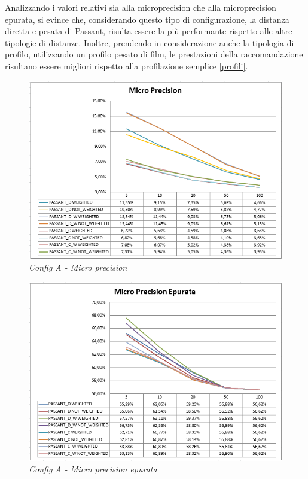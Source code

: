 Analizzando i valori relativi sia alla microprecision che alla microprecision epurata, si evince che, considerando questo tipo di configurazione, la distanza diretta e pesata di Passant, risulta essere la più performante rispetto alle altre tipologie di distanze. Inoltre, prendendo in considerazione anche la tipologia di profilo, utilizzando un profilo pesato di film, le prestazioni della raccomandazione risultano essere migliori rispetto alla profilazione semplice \ref{profili}.
\begin{figure}[H]
	\includegraphics[width=.9\textwidth]{./images/graphs/micro_prec_Own}
	\caption{\emph{Config A - Micro precision}}
\end{figure}

\begin{figure}[H]
	\includegraphics[width=.9\textwidth]{./images/graphs/micro_precT_Own}
	\caption{\emph{Config A - Micro precision epurata}}
\end{figure}

